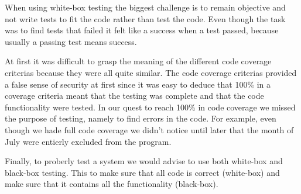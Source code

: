 When using white-box testing the biggest challenge is to remain objective and not write tests to fit the code rather than test the code. Even though the task was to find tests that failed it felt like a success when a test passed, because usually a passing test means success. 

\noindent At first it was difficult to grasp the meaning of the different code coverage criterias because they were all quite similar. The code coverage criterias provided a false sense of security at first since it was easy to deduce that 100\% in a coverage criteria meant that the testing was complete and that the code functionality were tested. In our quest to reach 100\% in code coverage we missed the purpose of testing, namely to find errors in the code. For example, even though we hade full code coverage we didn't notice until later that the month of July were entierly excluded from the program.

\noindent Finally, to proberly test a system we would advise to use both white-box and black-box testing. This to make sure that all code is correct (white-box) and make sure that it contains all the functionality (black-box).